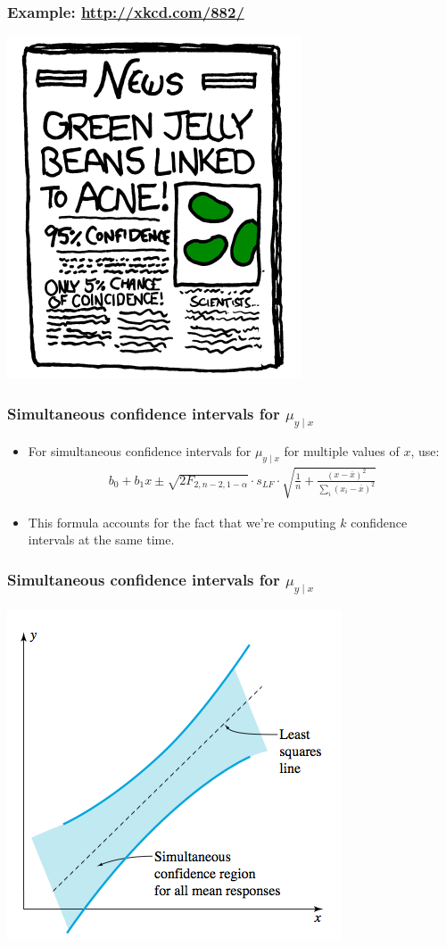 \documentclass[handout]{beamer}\usepackage{graphicx, color}
\providecommand{\ov}[1]{\overline{#1}}
\numberwithin{equation}{section}
\begin{document}
\begin{frame}
\frametitle{Example: \url{http://xkcd.com/882/}}
\begin{center}
 \includegraphics{../../fig/xkcd4.png}
\end{center}
\end{frame}

\begin{frame}
\frametitle{Simultaneous confidence intervals for $\mu_{y \mid x}$}
\begin{itemize}
\item For simultaneous confidence intervals for $\mu_{y \mid x}$ for multiple values of $x$, use:
\pause \begin{align*}
b_0 + b_1 x \pm \sqrt{2 F_{2, n-2, 1 - \alpha}} \cdot s_{LF} \cdot \sqrt{ \frac{1}{n} + \frac{(x - \ov{x})^2}{\sum_i(x_i - \ov{x})^2}}
\end{align*}
\pause \item This formula accounts for the fact that we're computing $k$ confidence intervals at the same time.
\end{itemize}
\end{frame}

\begin{frame}
\frametitle{Simultaneous confidence intervals for $\mu_{y \mid x}$}
 \includegraphics{../../fig/simconf.png}
\end{frame}
\end{document}
